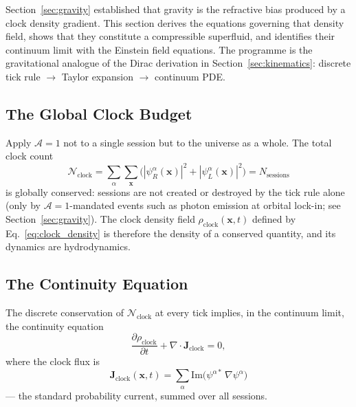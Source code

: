 
\label{sec:clock_fluid}

Section~\ref{sec:gravity} established that gravity is the refractive
bias produced by a clock density gradient.
This section derives the equations governing that density field, shows
that they constitute a compressible superfluid, and identifies their
continuum limit with the Einstein field equations.
The programme is the gravitational analogue of the Dirac derivation in
Section~\ref{sec:kinematics}: discrete tick rule $\to$ Taylor expansion
$\to$ continuum PDE.

\subsection{The Global Clock Budget}
\label{subsec:clock_budget}

Apply $\mathcal{A}=1$ not to a single session but to the universe as a whole.
The total clock count
\begin{equation}
    \mathcal{N}_\text{clock}
        = \sum_\alpha \sum_{\mathbf{x}}
          \bigl(|\psi_R^\alpha(\mathbf{x})|^2
              + |\psi_L^\alpha(\mathbf{x})|^2\bigr)
        = N_\text{sessions}
    \label{eq:global_clock_budget}
\end{equation}
is globally conserved: sessions are not created or destroyed by the tick
rule alone (only by $\mathcal{A}=1$-mandated events such as photon emission
at orbital lock-in; see Section~\ref{sec:gravity}).
The clock density field $\rho_\text{clock}(\mathbf{x},t)$ defined by
Eq.~\eqref{eq:clock_density} is therefore the density of a conserved
quantity, and its dynamics are hydrodynamics.

\subsection{The Continuity Equation}
\label{subsec:continuity}

The discrete conservation of $\mathcal{N}_\text{clock}$ at every tick
implies, in the continuum limit, the continuity equation
\begin{equation}
    \frac{\partial \rho_\text{clock}}{\partial t}
        + \nabla \cdot \mathbf{J}_\text{clock} = 0,
    \label{eq:clock_continuity}
\end{equation}
where the clock flux is
\begin{equation}
    \mathbf{J}_\text{clock}(\mathbf{x},t)
        = \sum_\alpha \mathrm{Im}
          \bigl(\psi^{\alpha*}\,\nabla\psi^\alpha\bigr)
    \label{eq:clock_flux}
\end{equation}
--- the standard probability current, summed over all sessions.

